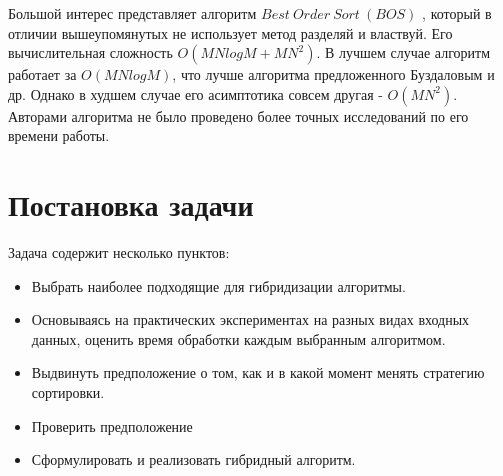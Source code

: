 Большой интерес представляет алгоритм $Best~Order~Sort~(BOS)$ \cite{BOS}, который в отличии вышеупомянутых не использует метод разделяй и властвуй. Его вычислительная сложность $O(MNlogM+MN^2)$. В лучшем случае алгоритм работает за $O(MNlogM)$, что лучше алгоритма предложенного Буздаловым и др. Однако в худшем случае его асимптотика совсем другая - $O(MN^2)$. Авторами алгоритма не было проведено более точных исследований по его времени работы. 

\section{Постановка задачи}

Задача содержит несколько пунктов: 
\begin{itemize}
	\item Выбрать наиболее подходящие для гибридизации алгоритмы.
	\item Основываясь на практических экспериментах на разных видах входных данных, оценить время обработки каждым выбранным алгоритмом. 	
	\item Выдвинуть предположение о том, как и в какой момент менять стратегию сортировки. 
	\item Проверить предположение
	\item Сформулировать и реализовать гибридный алгоритм.
\end{itemize} 